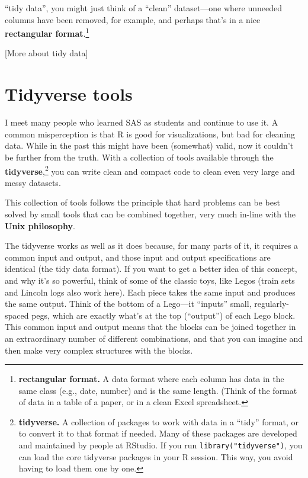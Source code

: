 \documentclass[]{tufte-book}
\begin{document}
 ``tidy data'', you might just think of a ``clean''
dataset---one where unneeded columns have been removed, for example, and
perhaps that's in a nice \textbf{rectangular format}.\footnote{\textbf{rectangular format.} A data format
  where each column has data in the same class (e.g., date, number) and is the
  same length. (Think of the format of data in a table of a paper, or in a clean
  Excel spreadsheet.}

{[}More about tidy data{]}

\hypertarget{tidyverse-tools}{%
\section{Tidyverse tools}\label{tidyverse-tools}}

 I meet many people who learned SAS as students
and continue
to use it. A common misperception is that R is good for visualizations, but bad for
cleaning data. While in the past this might have been (somewhat) valid, now it couldn't
be further from the truth. With a collection of tools available through the
\textbf{tidyverse},\footnote{\textbf{tidyverse.} A collection of packages to work with data in a
  ``tidy'' format, or to convert it to that format if needed. Many of these packages
  are developed and maintained by people at RStudio. If you run \texttt{library("tidyverse")},
  you can load the core tidyverse packages in your R session. This way, you avoid
  having to load them one by one.}
you can write clean and compact code to clean even very large and
messy datasets.

This collection of tools follows the principle that hard problems can be best solved
by small tools that can be combined together, very much in-line with the \textbf{Unix
philosophy}.

The tidyverse works as well as it does because, for many parts of it, it requires
a common input and output, and those input and output specifications are
identical (the tidy data format).
If you want to get a better idea of this concept, and why it's so powerful,
think of some of the
classic toys, like Legos (train sets and Lincoln logs also
work here). Each piece takes the same input and produces the same output. Think of
the bottom of a Lego---it ``inputs'' small, regularly-spaced pegs, which are exactly
what's at the top (``output'') of each Lego block. This common input and output
means that the blocks can be joined together in an extraordinary number of
different combinations, and that you can imagine and then make very complex
structures with the blocks.
\end{document}
